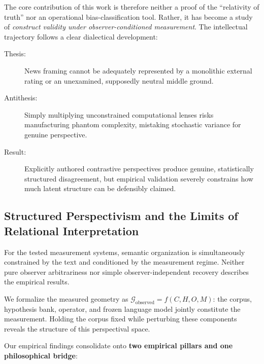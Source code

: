 The core contribution of this work is therefore neither a proof of the ``relativity of truth'' nor an operational bias-classification tool. Rather, it has become a study of \emph{construct validity under observer-conditioned measurement}. The intellectual trajectory follows a clear dialectical development:
\begin{description}
    \item[Thesis:] News framing cannot be adequately represented by a monolithic external rating or an unexamined, supposedly neutral middle ground.
    \item[Antithesis:] Simply multiplying unconstrained computational lenses risks manufacturing phantom complexity, mistaking stochastic variance for genuine perspective.
    \item[Result:] Explicitly authored contrastive perspectives produce genuine, statistically structured disagreement, but empirical validation severely constrains how much latent structure can be defensibly claimed.
\end{description}
\subsection{Structured Perspectivism and the Limits of Relational Interpretation}
\label{sec:structured_perspectivism}

For the tested measurement systems, semantic organization is simultaneously constrained by the text and conditioned by the measurement regime. Neither pure observer arbitrariness nor simple observer-independent recovery describes the empirical results.

We formalize the measured geometry as $\mathcal{G}_{\mathrm{observed}} = f(C, H, O, M)$: the corpus, hypothesis bank, operator, and frozen language model jointly constitute the measurement. Holding the corpus fixed while perturbing these components reveals the structure of this perspectival space.

Our empirical findings consolidate onto \textbf{two empirical pillars and one philosophical bridge}:

